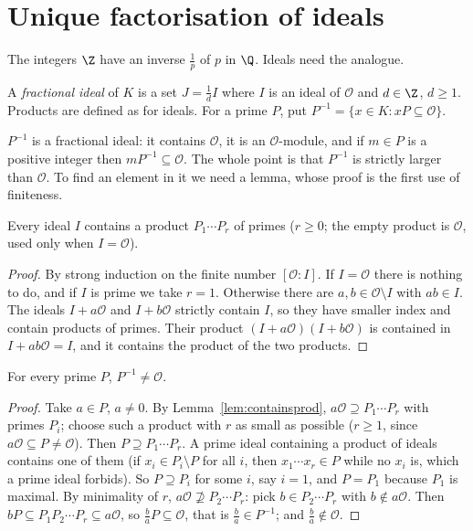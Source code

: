 \section{Unique factorisation of ideals}

The integers $\Z$ have an inverse $\frac1p$ of $p$ in $\Q$. Ideals need the analogue.

\begin{definition}
A \emph{fractional ideal} of $K$ is a set $J=\frac1d I$ where $I$ is an ideal of $\mathcal O$ and $d\in\Z$, $d\ge1$.
Products are defined as for ideals. For a prime $P$, put $P^{-1}=\{x\in K:xP\subseteq\mathcal O\}$.
\end{definition}

$P^{-1}$ is a fractional ideal: it contains $\mathcal O$, it is an $\mathcal O$-module, and if $m\in P$ is a positive
integer then $mP^{-1}\subseteq\mathcal O$. The whole point is that $P^{-1}$ is strictly larger than $\mathcal O$. To find an
element in it we need a lemma, whose proof is the first use of finiteness.

\begin{lemma}\label{lem:containsprod}
Every ideal $I$ contains a product $P_1\cdots P_r$ of primes ($r\ge0$; the empty product is $\mathcal O$, used only when
$I=\mathcal O$).
\end{lemma}
\begin{proof}
By strong induction on the finite number $[\mathcal O:I]$. If $I=\mathcal O$ there is nothing to do, and if $I$ is prime
we take $r=1$. Otherwise there are $a,b\in\mathcal O\setminus I$ with $ab\in I$. The ideals $I+a\mathcal O$ and
$I+b\mathcal O$ strictly contain $I$, so they have smaller index and contain products of primes. Their product
$(I+a\mathcal O)(I+b\mathcal O)$ is contained in $I+ab\mathcal O=I$, and it contains the product of the two products.
\end{proof}

\begin{lemma}\label{lem:missing}
For every prime $P$, $P^{-1}\ne\mathcal O$.
\end{lemma}
\begin{proof}
Take $a\in P$, $a\ne0$. By Lemma~\ref{lem:containsprod}, $a\mathcal O\supseteq P_1\cdots P_r$ with primes $P_i$; choose
such a product with $r$ as small as possible ($r\ge1$, since $a\mathcal O\subseteq P\ne\mathcal O$). Then
$P\supseteq P_1\cdots P_r$. A prime ideal containing a product of ideals contains one of them (if $x_i\in P_i\setminus P$
for all $i$, then $x_1\cdots x_r\in P$ while no $x_i$ is, which a prime ideal forbids). So $P\supseteq P_i$ for some $i$,
say $i=1$, and $P=P_1$ because $P_1$ is maximal. By minimality of $r$, $a\mathcal O\not\supseteq P_2\cdots P_r$: pick
$b\in P_2\cdots P_r$ with $b\notin a\mathcal O$. Then $bP\subseteq P_1P_2\cdots P_r\subseteq a\mathcal O$, so
$\frac baP\subseteq\mathcal O$, that is $\frac ba\in P^{-1}$; and $\frac ba\notin\mathcal O$.
\end{proof}

